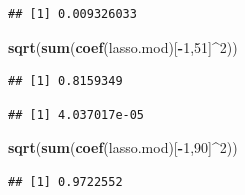 \documentclass[]{article}
\newenvironment{Shaded}{\begin{snugshade}}{\end{snugshade}}
\newcommand{\KeywordTok}[1]{\textcolor[rgb]{0.13,0.29,0.53}{\textbf{#1}}}
\newcommand{\DecValTok}[1]{\textcolor[rgb]{0.00,0.00,0.81}{#1}}
\newcommand{\OperatorTok}[1]{\textcolor[rgb]{0.81,0.36,0.00}{\textbf{#1}}}
\newcommand{\NormalTok}[1]{#1}
\begin{document}
\begin{verbatim}
## [1] 0.009326033
\end{verbatim}

\begin{Shaded}
\begin{Highlighting}[]
\KeywordTok{sqrt}\NormalTok{(}\KeywordTok{sum}\NormalTok{(}\KeywordTok{coef}\NormalTok{(lasso.mod)[}\OperatorTok{-}\DecValTok{1}\NormalTok{,}\DecValTok{51}\NormalTok{]}\OperatorTok{^}\DecValTok{2}\NormalTok{))}
\end{Highlighting}
\end{Shaded}

\begin{verbatim}
## [1] 0.8159349
\end{verbatim}

\begin{Shaded}
\end{Shaded}

\begin{verbatim}
## [1] 4.037017e-05
\end{verbatim}

\begin{Shaded}
\begin{Highlighting}[]
\KeywordTok{sqrt}\NormalTok{(}\KeywordTok{sum}\NormalTok{(}\KeywordTok{coef}\NormalTok{(lasso.mod)[}\OperatorTok{-}\DecValTok{1}\NormalTok{,}\DecValTok{90}\NormalTok{]}\OperatorTok{^}\DecValTok{2}\NormalTok{))}
\end{Highlighting}
\end{Shaded}

\begin{verbatim}
## [1] 0.9722552
\end{verbatim}
\end{document}
